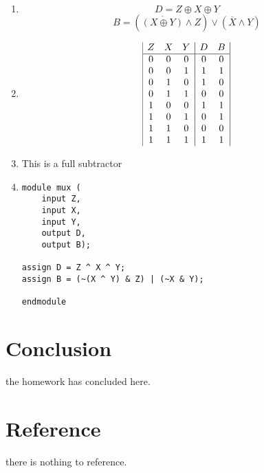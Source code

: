 \documentclass{article}
\begin{document}
    \begin{enumerate}[label={\alph*)}]
        \item {
            \begin{displaymath}
                D = Z \oplus X \oplus Y
            \end{displaymath}
            \begin{displaymath}
                B = (\overline{(X \oplus Y)} \land Z) \lor (\overline{X} \land Y)
            \end{displaymath}
        }
        \item \begin{displaymath}
            \begin{array}{|c c c | c c |}
                Z & X & Y & D & B \\
                \hline
                0 & 0 & 0 & 0 & 0 \\
                0 & 0 & 1 & 1 & 1 \\
                0 & 1 & 0 & 1 & 0 \\
                0 & 1 & 1 & 0 & 0 \\
                1 & 0 & 0 & 1 & 1 \\
                1 & 0 & 1 & 0 & 1 \\
                1 & 1 & 0 & 0 & 0 \\
                1 & 1 & 1 & 1 & 1 \\
            \end{array}
        \end{displaymath}
        \item This is a full subtractor
        \item {
            \begin{lstlisting}
module mux (
    input Z,
    input X,
    input Y,
    output D,
    output B);

assign D = Z ^ X ^ Y;
assign B = (~(X ^ Y) & Z) | (~X & Y);

endmodule
            \end{lstlisting}
        }
    \end{enumerate}

    \section*{Conclusion}
    the homework has concluded here.
    \section*{Reference}
    there is nothing to reference.
\end{document}
